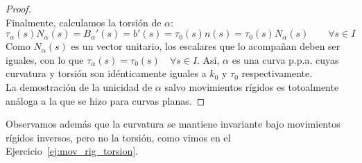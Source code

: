 \begin{teo}
\begin{proof}
\begin{equation*}
        \end{equation*}
        Finalmente, calculamos la torsión de $\alpha$:
        \begin{equation*}
            \tau_\alpha(s) N_\alpha(s) = B_\alpha'(s) = b'(s) = \tau_0(s) n(s) = \tau_0(s) N_\alpha(s) \qquad \forall s\in I
        \end{equation*}
        Como $N_\alpha(s)$ es un vector unitario, los escalares que lo acompañan deben ser iguales, con lo que $\tau_\alpha(s) = \tau_0(s)\quad \forall s\in I$. Así, $\alpha$ es una curva p.p.a. cuyas curvatura y torsión son idénticamente iguales a $k_0$ y $\tau_0$ respectivamente.\\

        \noindent
        La demostración de la unicidad de $\alpha$ salvo movimientos rígidos es totoalmente análoga a la que se hizo para curvas planas.
    \end{proof}
\end{teo}

\begin{observacion}
    Observamos además que la curvatura se mantiene invariante bajo movimientos rígidos inversos, pero no la torsión, como vimos en el Ejercicio~\ref{ej:mov_rig_torsion}.
\end{observacion}

